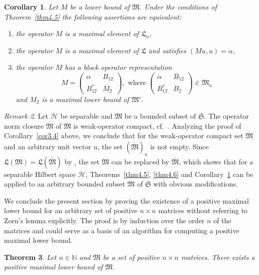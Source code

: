 \documentclass[12pt, a4paper, reqno, twoside]{amsart}
\numberwithin{equation}{section}
\newcommand{\frakS}{\mathfrak S}
\newcommand{\frakL}{\mathfrak L}
\newcommand{\frakM}{\mathfrak M}
\newtheorem{theorem}{Theorem}[section]
\newtheorem{corollary}[theorem]{Corollary}
\theoremstyle{definition}
\theoremstyle{remark}
\newtheorem{remark}[theorem]{Remark}
\theoremstyle{mystyle}
\begin{document}
\begin{corollary}
\label{cor4.9}
Let $M$ be a lower bound of $\frakM$. Under the conditions of
Theorem~\ref{thm4.5} the following assertions are equivalent:
\begin{enumerate}
\item[(i)]
the operator $M$ is a maximal element of $\frakL_{u}$,
\item[(ii)]  
the operator $M$ is a maximal element of $\frakL$ and satisfies
$(Mu,u)=\alpha$,
\item[(iii)]
the operator $M$ has a block operator representation
\[
M =   
\begin{pmatrix} \alpha & B_{12} \\ B_{12}^{\ast} & M_{2}\end{pmatrix},
\text{ where }
\begin{pmatrix} \alpha & B_{12} \\ B_{12}^{\ast} & B_{2}\end{pmatrix}
\in\frakM_{u}
\]  
and $M_{2}$ is a maximal lower bound of $\frakM'$.
\end{enumerate}
\end{corollary}

\begin{remark}
\label{rem4.10}
Let $\mathscr H$ be separable and $\frakM$ be a bounded subset of
$\frakS$. The operator norm closure $\overline{\frakM}$ of $\frakM$ is
weak-operator compact, cf.\
\cite[Thm.~5.1.3]{KadisonRingrose1983}. Analyzing the proof of
Corollary~\ref{cor3.4} above, we conclude that for the weak-operator
compact set $\overline{\frakM}$ and an arbitrary unit vector $u$, the
set $(\overline{\frakM})_{u}$ is not empty. Since
$\frakL(\frakM)=\frakL(\overline{\frakM})$ by , the set $\frakM$
can be replaced by $\overline{\frakM}$, which shows that for a
separable Hilbert space $\mathscr H$, Theorems~\ref{thm4.5}, 
\ref{thm4.6} and Corollary~\ref{cor4.9} can be applied to an arbitrary
bounded subset $\frakM$ of $\frakS$ with obvious modifications.
\end{remark}

We conclude the present section by proving the existence of a positive
maximal lower bound for an arbitrary set of positive $n\times n$
matrices without referring to Zorn's lemma explicitly. The proof is
by induction over the order $n$ of the matrices and could serve as a
basis of an algorithm for computing a positive maximal lower bound.

\begin{theorem}
\label{thm4.11}
Let $n\in\mathbb N$ and $\frakM$ be a set of positive $n\times n$
matrices. There exists a positive maximal lower bound of $\frakM$.
\end{theorem}
\end{document}
